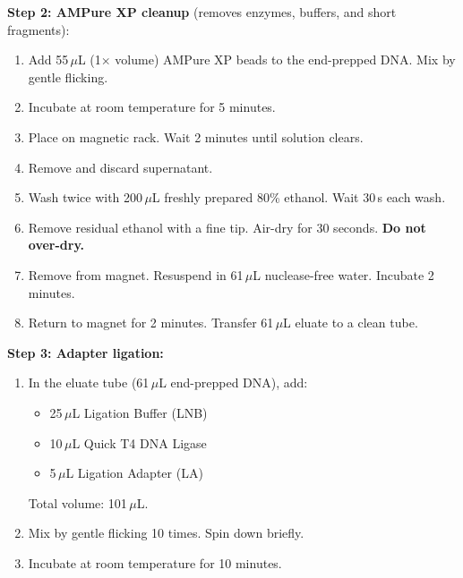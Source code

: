 \begin{protocolbox}[title={Protocol: Nanopore Ligation Sequencing (SQK-LSK114)}]
\textbf{Step 2: AMPure XP cleanup} (removes enzymes, buffers, and short fragments):
\begin{enumerate}[nosep, start=5]
  \item Add 55\,$\mu$L (1$\times$ volume) AMPure XP beads to the end-prepped DNA. Mix by gentle flicking.
  \item Incubate at room temperature for 5 minutes.
  \item Place on magnetic rack. Wait 2 minutes until solution clears.
  \item Remove and discard supernatant.
  \item Wash twice with 200\,$\mu$L freshly prepared 80\% ethanol. Wait 30\,s each wash.
  \item Remove residual ethanol with a fine tip. Air-dry for 30 seconds. \textbf{Do not over-dry.}
  \item Remove from magnet. Resuspend in 61\,$\mu$L nuclease-free water. Incubate 2 minutes.
  \item Return to magnet for 2 minutes. Transfer 61\,$\mu$L eluate to a clean tube.
\end{enumerate}

\textbf{Step 3: Adapter ligation:}
\begin{enumerate}[nosep, start=13]
  \item In the eluate tube (61\,$\mu$L end-prepped DNA), add:
    \begin{itemize}[nosep]
      \item 25\,$\mu$L Ligation Buffer (LNB)
      \item 10\,$\mu$L Quick T4 DNA Ligase
      \item 5\,$\mu$L Ligation Adapter (LA)
    \end{itemize}
    Total volume: 101\,$\mu$L.
  \item Mix by gentle flicking 10 times. Spin down briefly.
  \item Incubate at room temperature for 10 minutes.
\end{enumerate}


\end{protocolbox}
